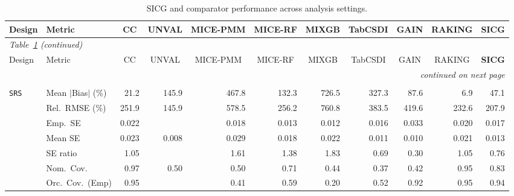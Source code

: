 \begin{landscape}
\footnotesize\setlength{\tabcolsep}{3.5pt}
\begin{longtable}{llrrrrrrrrr}
\caption{SICG and comparator performance across analysis settings.}
\label{tab:appc_vccc_LOGISTIC} \\
\toprule
Design & Metric & \multicolumn{1}{c}{CC} & \multicolumn{1}{c}{UNVAL} & \multicolumn{1}{c}{MICE-PMM} & \multicolumn{1}{c}{MICE-RF} & \multicolumn{1}{c}{MIXGB} & \multicolumn{1}{c}{TabCSDI} & \multicolumn{1}{c}{GAIN} & \multicolumn{1}{c}{RAKING} & \multicolumn{1}{c}{\textbf{SICG}} \\
\midrule \endfirsthead
\multicolumn{11}{l}{\footnotesize\itshape Table~\ref{tab:appc_vccc_LOGISTIC} (continued)} \\
\toprule
Design & Metric & \multicolumn{1}{c}{CC} & \multicolumn{1}{c}{UNVAL} & \multicolumn{1}{c}{MICE-PMM} & \multicolumn{1}{c}{MICE-RF} & \multicolumn{1}{c}{MIXGB} & \multicolumn{1}{c}{TabCSDI} & \multicolumn{1}{c}{GAIN} & \multicolumn{1}{c}{RAKING} & \multicolumn{1}{c}{\textbf{SICG}} \\
\midrule \endhead
\midrule \multicolumn{11}{r}{\footnotesize\itshape continued on next page} \\
\endfoot
\bottomrule \endlastfoot
\multicolumn{11}{l}{\textbf{Continuous Phase-Two Covariates}} \\
\addlinespace[2pt]
\quad \texttt{SRS} & Mean $|$Bias$|$ (\%) & \cellcolor{ranktwo}21.2 & 145.9 & 467.8 & 132.3 & 726.5 & 327.3 & 87.6 & \cellcolor{rankone}6.9 & \cellcolor{rankthree}47.1 \\
 & Rel.\ RMSE (\%) & 251.9 & \cellcolor{rankone}145.9 & 578.5 & 256.2 & 760.8 & 383.5 & 419.6 & \cellcolor{rankthree}232.6 & \cellcolor{ranktwo}207.9 \\
 & Emp.\ SE & 0.022 &  & 0.018 & 0.013 & 0.012 & 0.016 & 0.033 & 0.020 & 0.017 \\
 & Mean SE & 0.023 & 0.008 & 0.029 & 0.018 & 0.022 & 0.011 & 0.010 & 0.021 & 0.013 \\
 & SE ratio & \cellcolor{rankone}1.05 &  & 1.61 & 1.38 & 1.83 & \cellcolor{rankthree}0.69 & 0.30 & \cellcolor{rankone}1.05 & \cellcolor{ranktwo}0.76 \\
 & Nom.\ Cov. & \cellcolor{ranktwo}0.97 & 0.50 & 0.50 & 0.71 & 0.44 & 0.37 & 0.42 & \cellcolor{rankone}0.95 & \cellcolor{rankthree}0.83 \\
 & Orc.\ Cov.\ (Emp) & \cellcolor{rankone}0.95 &  & 0.41 & 0.59 & 0.20 & 0.52 & \cellcolor{rankthree}0.92 & \cellcolor{rankone}0.95 & \cellcolor{ranktwo}0.94 \\

\end{longtable}
\end{landscape}
